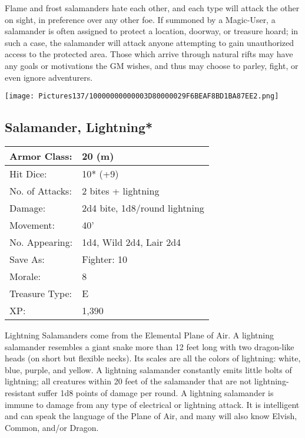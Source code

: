 \documentclass[a4paper,twoside,openany,10pt]{book}
\begin{document}
\begin{multicols}{2}
Flame and frost salamanders hate each other, and each type will attack the other on sight, in preference over any other foe. If summoned by a Magic-User, a salamander is often assigned to protect a location, doorway, or treasure hoard; in such a case, the salamander will attack anyone attempting to gain unauthorized access to the protected area. Those which arrive through natural rifts may have any goals or motivations the GM wishes, and thus may choose to parley, fight, or even ignore adventurers.

\vfill

\begin{center} \texttt{[image: Pictures137/10000000000003D80000029F6BEAF8BD1BA87EE2.png]} \end{center}


\subsection*{Salamander, Lightning*}\label{salamander-lightning}

\begin{tabularx}{0.50\textwidth}{@{}lX@{}}
Armor Class: & 20 (m) \\\hline
Hit Dice: & 10* (+9) \\\hline
No. of Attacks: & 2 bites + lightning \\\hline
Damage: & 2d4 bite, 1d8/round lightning \\\hline
Movement: & 40' \\\hline
No. Appearing: & 1d4, Wild 2d4, Lair 2d4 \\\hline
Save As: & Fighter: 10 \\\hline
Morale: & 8 \\\hline
Treasure Type: & E \\\hline
XP: & 1,390 \\\hline
\end{tabularx}\medskip

Lightning Salamanders come from the Elemental Plane of Air. A lightning salamander resembles a giant snake more than 12 feet long with two dragon-like heads (on short but flexible necks). Its scales are all the colors of lightning: white, blue, purple, and yellow. A lightning salamander constantly emits little bolts of lightning; all creatures within 20 feet of the salamander that are not lightning-resistant suffer 1d8 points of damage per round. A lightning salamander is immune to damage from any type of electrical or lightning attack. It is intelligent and can speak the language of the Plane of Air, and many will also know Elvish, Common, and/or Dragon.


\end{multicols}
\end{document}
